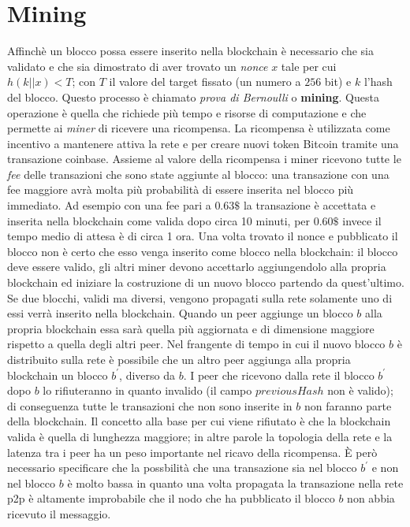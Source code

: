 \section{Mining}
Affinchè un blocco possa essere inserito nella blockchain è necessario che sia validato e che sia dimostrato di aver trovato un \textit{nonce} $x$ tale per cui $h(k||x)<T$; con $T$ il valore del target fissato (un numero a $256$ bit) e $k$ l'hash del blocco. Questo processo è chiamato \textit{prova di Bernoulli} o \textbf{mining}.\newline
Questa operazione è quella che richiede più tempo e risorse di computazione e che permette ai \textit{miner} di ricevere una ricompensa.\newline
La ricompensa è utilizzata come incentivo a mantenere attiva la rete e per creare nuovi token Bitcoin tramite una transazione coinbase. Assieme al valore della ricompensa i miner ricevono tutte le \textit{fee} delle transazioni che sono state aggiunte al blocco: una transazione con una fee maggiore avrà molta più probabilità di essere inserita nel blocco più immediato. Ad esempio con una fee pari a $0.63\$$ la transazione è accettata e inserita nella blockchain come valida dopo circa 10 minuti, per $0.60\$$ invece il tempo medio di attesa è di circa 1 ora.\newline
Una volta trovato il nonce e pubblicato il blocco non è certo che esso venga inserito come blocco nella blockchain: il blocco deve essere valido, gli altri miner devono accettarlo aggiungendolo alla propria blockchain ed iniziare la costruzione di un nuovo blocco partendo da quest'ultimo. Se due blocchi, validi ma diversi, vengono propagati sulla rete solamente uno di essi verrà inserito nella blockchain. Quando un peer aggiunge un blocco $b$ alla propria blockchain essa sarà quella più aggiornata e di dimensione maggiore rispetto a quella degli altri peer. Nel frangente di tempo in cui il nuovo blocco $b$ è distribuito sulla rete è possibile che un altro peer aggiunga alla propria blockchain un blocco $b^{'}$, diverso da $b$. I peer che ricevono dalla rete il blocco $b^{'}$ dopo $b$ lo rifiuteranno in quanto invalido (il campo $previousHash$ non è valido); di conseguenza tutte le transazioni che non sono inserite in $b$ non faranno parte della blockchain. Il concetto alla base per cui viene rifiutato è che la blockchain valida è quella di lunghezza maggiore; in altre parole la topologia della rete e la latenza tra i peer ha un peso importante nel ricavo della ricompensa. È però necessario specificare che la possbilità che una transazione sia nel blocco $b^{'}$ e non nel blocco $b$ è molto bassa in quanto una volta propagata la transazione nella rete p2p è altamente improbabile che il nodo che ha pubblicato il blocco $b$ non abbia ricevuto il messaggio.\newline\newline
